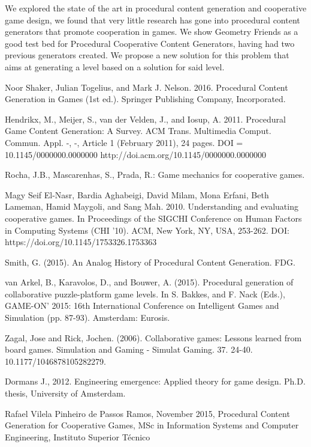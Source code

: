 \documentclass[runningheads]{llncs}
\begin{document}
We explored the state of the art in procedural content generation and cooperative game design, we found that very little research has gone into procedural content generators that promote cooperation in games. We show Geometry Friends as a good test bed for Procedural Cooperative Content Generators, having had two previous generators created. We propose a new solution for this problem that aims at generating a level based on a solution for said level.

\begin{thebibliography}{40}

Noor Shaker, Julian Togelius, and Mark J. Nelson. 2016. Procedural Content Generation in Games (1st ed.). Springer Publishing Company, Incorporated.

Hendrikx, M., Meijer, S., van der Velden, J., and Iosup, A. 2011. Procedural Game Content Generation: A Survey. ACM Trans. Multimedia Comput. Commun. Appl. -, -, Article 1 (February 2011), 24 pages. DOI = 10.1145/0000000.0000000 http://doi.acm.org/10.1145/0000000.0000000

Rocha, J.B., Mascarenhas, S., Prada, R.: Game mechanics for cooperative games. 

Magy Seif El-Nasr, Bardia Aghabeigi, David Milam, Mona Erfani, Beth Lameman, Hamid Maygoli, and Sang Mah. 2010. Understanding and evaluating cooperative games. In Proceedings of the SIGCHI Conference on Human Factors in Computing Systems (CHI '10). ACM, New York, NY, USA, 253-262. DOI: https://doi.org/10.1145/1753326.1753363

Smith, G. (2015). An Analog History of Procedural Content Generation. FDG.

van Arkel, B., Karavolos, D., and Bouwer, A. (2015). Procedural generation of collaborative puzzle-platform game levels. In S. Bakkes, and F. Nack (Eds.), GAME-ON' 2015: 16th International Conference on Intelligent Games and Simulation (pp. 87-93). Amsterdam: Eurosis.

Zagal, Jose and Rick, Jochen. (2006). Collaborative games: Lessons learned from board games. Simulation and Gaming - Simulat Gaming. 37. 24-40. 10.1177/1046878105282279. 

Dormans J., 2012. Engineering emergence: Applied theory for game design. Ph.D. thesis, University of Amsterdam.

Rafael Vilela Pinheiro de Passos Ramos, November 2015, Procedural Content Generation for Cooperative Games, MSc in Information Systems and Computer Engineering, Instituto Superior Técnico


\end{thebibliography}
\end{document}
